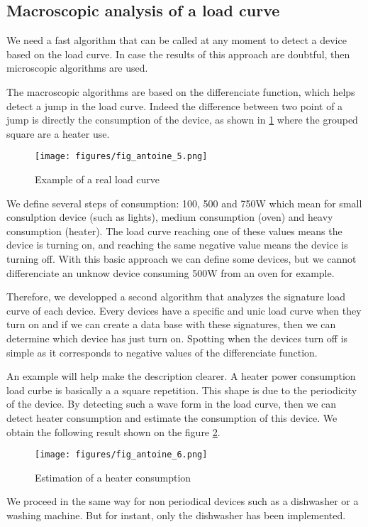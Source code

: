 \subsection{Macroscopic analysis of a load curve}
We need a fast algorithm that can be called at any moment to detect a device based on the load curve. In case the results of this approach are doubtful, then microscopic algorithms are used.

The macroscopic algorithms are based on the differenciate function, which helps detect a jump in the load curve. Indeed the difference between two point of a jump is directly the consumption of the device, as shown in \ref{fig1} where the grouped square are a heater use.

\begin{figure}[H]
\centering
\texttt{[image: figures/fig\_antoine\_5.png]}
\caption{Example of a real load curve}
\label{fig1}
\end{figure}

We define several steps of consumption: 100, 500 and 750W which mean for small consulption device (such as lights), medium consumption (oven) and heavy consumption (heater). The load curve reaching one of these values means the device is turning on, and reaching the same negative value means the device is turning off. With this basic approach we can define some devices, but we cannot differenciate an unknow device consuming 500W from an oven for example.

Therefore, we developped a second algorithm that analyzes the signature load curve of each device. Every devices have a specific and unic load curve when they turn on and if we can create a data base with these signatures, then we can determine which device has just turn on. Spotting when the devices turn off is simple as it corresponds to negative values of the differenciate function.

An example will help make the description clearer. A heater power consumption load curbe is basically a a square repetition. This shape is due to the periodicity of the device. By detecting such a wave form in the load curve, then we can detect heater consumption and estimate the consumption of this device. We obtain the following result shown on the figure \ref{fig2}.


\begin{figure}[H]
\centering
\texttt{[image: figures/fig\_antoine\_6.png]}
\caption{Estimation of a heater consumption}
\label{fig2}
\end{figure}


We proceed in the same way for non periodical devices such as a dishwasher or a washing machine. But for instant, only the dishwasher has been implemented.


